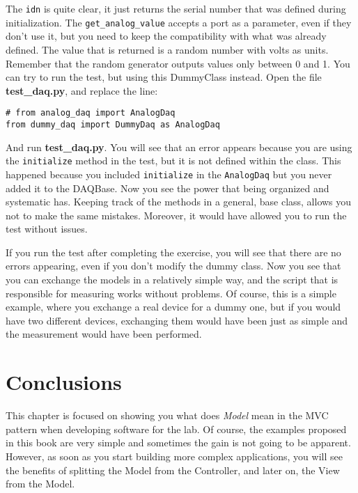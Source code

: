 The \texttt{idn} is quite clear, it just returns the serial number that
was defined during initialization. The \texttt{get_analog_value}
accepts a port as a parameter, even if they don't use it, but you need
to keep the compatibility with what was already defined. The value that
is returned is a random number with volts as units. Remember that the
random generator outputs values only between 0 and 1. You can try to run
the test, but using this DummyClass instead. Open the file
\textbf{test\_daq.py}, and replace the line:

\begin{verbatim}
# from analog_daq import AnalogDaq
from dummy_daq import DummyDaq as AnalogDaq
\end{verbatim}

And run \textbf{test\_daq.py}. You will see that an error appears
because you are using the \texttt{initialize} method in the test, but it
is not defined within the class. This happened because you included
\texttt{initialize} in the
\texttt{AnalogDaq} but you never added it to the DAQBase.
Now you see the power that being organized and systematic has. Keeping
track of the methods in a general, base class, allows you not to make
the same mistakes. Moreover, it would have allowed you to run the test
without issues.


If you run the test after completing the exercise, you will see that
there are no errors appearing, even if you don't modify the dummy class.
Now you see that you can exchange the models in a relatively simple way,
and the script that is responsible for measuring works without problems.
Of course, this is a simple example, where you exchange a real device
for a dummy one, but if you would have two different devices, exchanging
them would have been just as simple and the measurement would have
been performed.


\section{Conclusions}\label{conclusions}
This chapter is focused on showing you what does \emph{Model} mean in
the {MVC} pattern when developing software for the lab. Of course, the
examples proposed in this book are very simple and sometimes the gain is
not going to be apparent. However, as soon as you start building more
complex applications, you will see the benefits of splitting the Model
from the Controller, and later on, the View from the Model.

